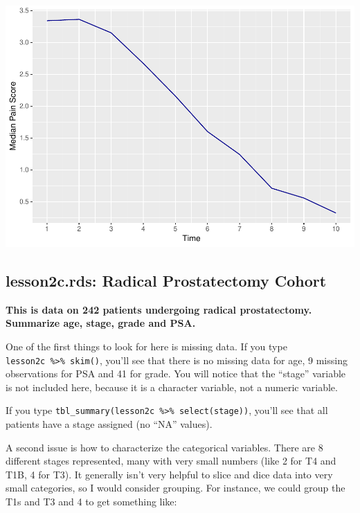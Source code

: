 \documentclass[]{book}
\begin{document}
\includegraphics{09-answers_files/figure-latex/week2f-1.pdf}

\hypertarget{lesson2c.rds-radical-prostatectomy-cohort}{%
\subsection{lesson2c.rds: Radical Prostatectomy Cohort}\label{lesson2c.rds-radical-prostatectomy-cohort}}

\textbf{This is data on 242 patients undergoing radical prostatectomy. Summarize age, stage, grade and PSA.}

One of the first things to look for here is missing data. If you type \texttt{lesson2c\ \%\textgreater{}\%\ skim()}, you'll see that there is no missing data for age, 9 missing observations for PSA and 41 for grade. You will notice that the ``stage'' variable is not included here, because it is a character variable, not a numeric variable.

If you type \texttt{tbl\_summary(lesson2c\ \%\textgreater{}\%\ select(stage))}, you'll see that all patients have a stage assigned (no ``NA'' values).

A second issue is how to characterize the categorical variables. There are 8 different stages represented, many with very small numbers (like 2 for T4 and T1B, 4 for T3). It generally isn't very helpful to slice and dice data into very small categories, so I would consider grouping. For instance, we could group the T1s and T3 and 4 to get something like:
\end{document}

